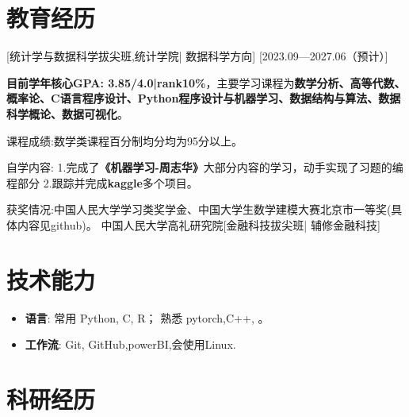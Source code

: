 \documentclass{resume}
\begin{document}


\ResumeTitle


\section{教育经历}
[\textnormal{统计学与数据科学拔尖班,统计学院|} 数据科学方向]
[2023.09—2027.06（预计）]

\textbf{目前学年核心GPA: 3.85/4.0|rank10\%}，主要学习课程为\textbf{数学分析、高等代数、概率论、C语言程序设计、Python程序设计与机器学习、数据结构与算法、数据科学概论、数据可视化}。

课程成绩:数学类课程百分制均分均为95分以上。

自学内容: 1.完成了\textbf{《机器学习-周志华》}大部分内容的学习，动手实现了习题的编程部分
2.跟踪并完成\textbf{kaggle}多个项目。

获奖情况:中国人民大学学习类奖学金、中国大学生数学建模大赛北京市一等奖(具体内容见github)。
\ResumeItem
{中国人民大学高礼研究院}[\textnormal{金融科技拔尖班|} 辅修金融科技]


\section[技术能力]{技术能力\protect}
\begin{itemize}
  \item \textbf{语言}: 常用 Python, C, R； 熟悉 pytorch,C++, 。
  \item \textbf{工作流}: Git, GitHub,powerBI,会使用Linux.
\end{itemize}

\section{科研经历}
\end{document}
